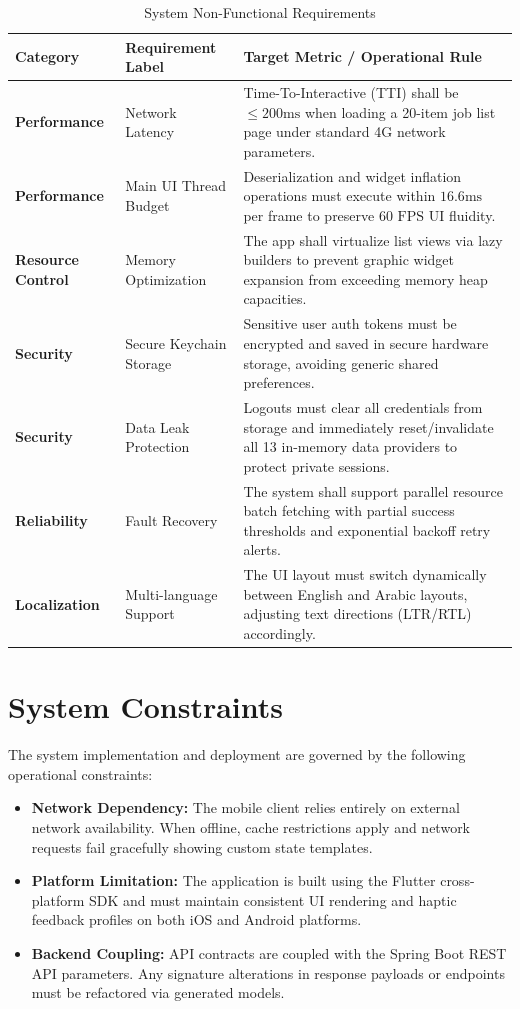 \begin{table}[htbp]
\centering
\caption{System Non-Functional Requirements}
\label{tab:non_functional_requirements}
\begin{tabular}{|l|p{3.5cm}|p{6.5cm}|}
\hline
\textbf{Category} & \textbf{Requirement Label} & \textbf{Target Metric / Operational Rule} \\ \hline
\textbf{Performance} & Network Latency & Time-To-Interactive (TTI) shall be $\le 200\text{ms}$ when loading a 20-item job list page under standard 4G network parameters. \\ \hline
\textbf{Performance} & Main UI Thread Budget & Deserialization and widget inflation operations must execute within $16.6\text{ms}$ per frame to preserve $60\text{ FPS}$ UI fluidity. \\ \hline
\textbf{Resource Control} & Memory Optimization & The app shall virtualize list views via lazy builders to prevent graphic widget expansion from exceeding memory heap capacities. \\ \hline
\textbf{Security} & Secure Keychain Storage & Sensitive user auth tokens must be encrypted and saved in secure hardware storage, avoiding generic shared preferences. \\ \hline
\textbf{Security} & Data Leak Protection & Logouts must clear all credentials from storage and immediately reset/invalidate all 13 in-memory data providers to protect private sessions. \\ \hline
\textbf{Reliability} & Fault Recovery & The system shall support parallel resource batch fetching with partial success thresholds and exponential backoff retry alerts. \\ \hline
\textbf{Localization} & Multi-language Support & The UI layout must switch dynamically between English and Arabic layouts, adjusting text directions (LTR/RTL) accordingly. \\ \hline
\end{tabular}
\end{table}

\section{System Constraints}
The system implementation and deployment are governed by the following operational constraints:
\begin{itemize}
    \item \textbf{Network Dependency:} The mobile client relies entirely on external network availability. When offline, cache restrictions apply and network requests fail gracefully showing custom state templates.
    \item \textbf{Platform Limitation:} The application is built using the Flutter cross-platform SDK and must maintain consistent UI rendering and haptic feedback profiles on both iOS and Android platforms.
    \item \textbf{Backend Coupling:} API contracts are coupled with the Spring Boot REST API parameters. Any signature alterations in response payloads or endpoints must be refactored via generated models.
\end{itemize}
